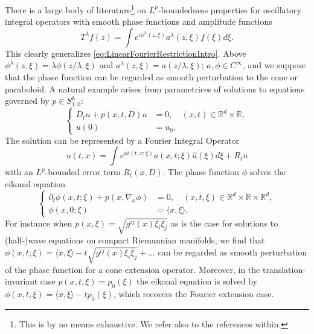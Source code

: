 \documentclass{amsart}
\theoremstyle{definition}
\newcommand{\R}{\mathbb{R}}
\begin{document}
There is a large body of literature\footnote{This is by no means exhaustive. We refer also to the references within.}  \cite{Bourgain1991II,Wisewell2005,Lee2006,BennettCarberyTao2006,BourgainGuth2011, GuthHickmanIliopoulou2019,Schippa2024Oscillatory,GuoWangZhang2024} on $L^p$-boundedness properties for oscillatory integral operators with smooth phase functions and amplitude functions
\begin{equation*}
T^\lambda f(z) = \int e^{i \phi^\lambda(z,\xi)} a^\lambda(z,\xi) f(\xi) d\xi.
\end{equation*}
This clearly generalizes \eqref{eq:LinearFourierRestrictionIntro}. Above $\phi^\lambda(z,\xi) = \lambda \phi(z/\lambda,\xi)$ and $a^\lambda(z,\xi) = a(z/\lambda,\xi)$; $a, \phi \in C^\infty$, and we suppose that the phase function can be regarded as smooth perturbation to the cone or paraboloid. A natural example arises from parametrices of solutions to equations governed by $p \in S^k_{1,0}$:
\begin{equation*}
\left\{ \begin{array}{cl}
D_t u + p(x,t,D) u &= 0, \quad (x,t) \in \R^d \times \R, \\
u(0) &= u_0.
\end{array} \right.
\end{equation*}
The solution can be represented by a Fourier Integral Operator
\begin{equation*}
u(t,x) = \int e^{i \phi(t,x;\xi)} a(x,t;\xi) \hat{u}(\xi) d\xi + R_t u
\end{equation*}
with an $L^p$-bounded error term $R_t(x,D)$. The phase function $\phi$ solves the eikonal equation
\begin{equation*}
\left\{ \begin{array}{cl}
\partial_t \phi(x,t;\xi) + p(x,\nabla_x \phi) &= 0, \quad (x,t,\xi) \in \R^d \times \R \times \R^d, \\
\phi(x,0;\xi) &= \langle x, \xi \rangle.
\end{array} \right.
\end{equation*}
For instance when $p(x,\xi) = \sqrt{g^{ij}(x) \xi_i \xi_j}$ as is the case for solutions to (half-)wave equations on compact Riemannian manifolds, we find that $\phi(x,t;\xi) = \langle x, \xi \rangle - t \sqrt{g^{ij}(x) \xi_i \xi_j} + \ldots$ can be regarded as smooth perturbation of the phase function for a cone extension operator. Moreover, in the translation-invariant case $p(x,t,\xi) = p_0(\xi)$ the eikonal equation is solved by $\phi(x,t,\xi) = \langle x, \xi \rangle - t p_0(\xi)$, which recovers the Fourier extension case.
\end{document}

